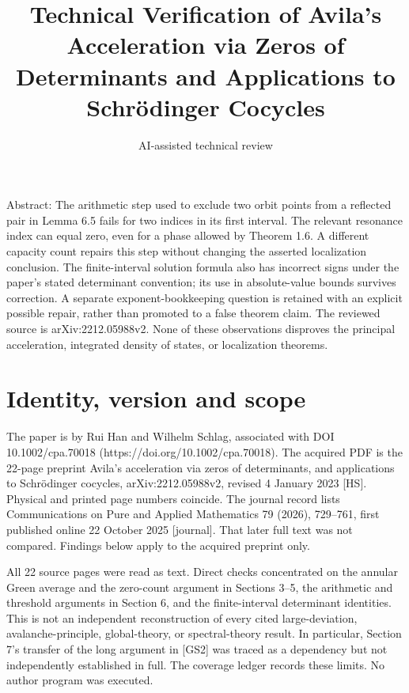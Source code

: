 \documentclass[10pt]{article}
\title{Technical Verification of Avila’s Acceleration via Zeros of Determinants and Applications to Schrödinger Cocycles}
\author{AI-assisted technical review}
\date{}
\begin{document}
\maketitle
Abstract: The arithmetic step used to exclude two orbit points from a reflected pair in Lemma 6.5 fails for two indices in its first interval. The relevant resonance index can equal zero, even for a phase allowed by Theorem 1.6. A different capacity count repairs this step without changing the asserted localization conclusion. The finite-interval solution formula also has incorrect signs under the paper’s stated determinant convention; its use in absolute-value bounds survives correction. A separate exponent-bookkeeping question is retained with an explicit possible repair, rather than promoted to a false theorem claim. The reviewed source is arXiv:2212.05988v2. None of these observations disproves the principal acceleration, integrated density of states, or localization theorems.\par
\section*{Identity, version and scope}
The paper is by Rui Han and Wilhelm Schlag, associated with DOI 10.1002/cpa.70018 (https://doi.org/10.1002/cpa.70018). The acquired PDF is the 22-page preprint Avila’s acceleration via zeros of determinants, and applications to Schrödinger cocycles, arXiv:2212.05988v2, revised 4 January 2023 [HS]. Physical and printed page numbers coincide. The journal record lists Communications on Pure and Applied Mathematics 79 (2026), 729–761, first published online 22 October 2025 [journal]. That later full text was not compared. Findings below apply to the acquired preprint only.\par
All 22 source pages were read as text. Direct checks concentrated on the annular Green average and the zero-count argument in Sections 3–5, the arithmetic and threshold arguments in Section 6, and the finite-interval determinant identities. This is not an independent reconstruction of every cited large-deviation, avalanche-principle, global-theory, or spectral-theory result. In particular, Section 7’s transfer of the long argument in [GS2] was traced as a dependency but not independently established in full. The coverage ledger records these limits. No author program was executed.\par
\end{document}
